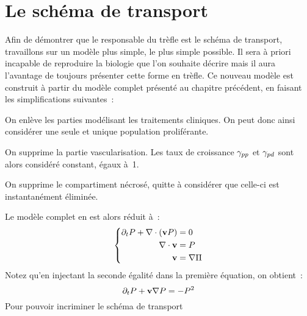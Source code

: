 \documentclass[main.tex]{subfiles}
\begin{document}
\section{Le schéma de transport}
Afin de démontrer que le responsable du trèfle est le schéma de transport, travaillons sur un modèle plus simple, le plus simple possible. Il sera à priori incapable de reproduire la biologie que l'on souhaite décrire mais il aura l'avantage de toujours présenter cette forme en trèfle. 
Ce nouveau modèle est construit à partir du modèle complet présenté au chapitre précédent, en faisant les simplifications suivantes~:
\begin{myitemize}
\item On enlève les parties modélisant les traitements cliniques. On peut donc ainsi considérer une seule et unique population proliférante.
\item On supprime la partie vascularisation. Les taux de croissance $\gamma_{pp}$ et $\gamma_{pd}$ sont alors considéré constant, égaux à~1.
\item On supprime le compartiment nécrosé, quitte à considérer que celle-ci est instantanément éliminée.
\end{myitemize}
Le modèle complet en est alors réduit à~:
\begin{equation}
\left\{ \begin{aligned}
\partial_t P + \nabla\cdot (\mathbf{v} P) &= 0 \\
\nabla\cdot \mathbf{v} &= P  \\
\mathbf{v} &= \nabla \Pi
\end{aligned} \right.
\end{equation}
Notez qu'en injectant la seconde égalité dans la première équation, on obtient~:
\begin{equation}
\partial_t P + \mathbf{v} \nabla P = -P^2
\end{equation}
Pour pouvoir incriminer le schéma de transport
\end{document}
